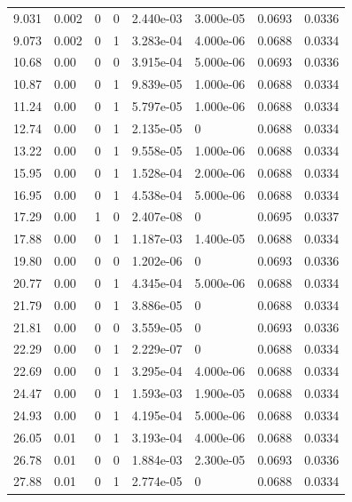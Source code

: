 \documentclass[preview]{standalone}
\begin{document}
{{\begin{tabular}{L{1.2cm}C{1.2cm} C{0.3cm}C{0.5cm} C{1.4cm}C{1.4cm} C{1.4cm}C{1.4cm}}
  9.031  &  0.002  & 0     &  0 &  2.440e-03  & 3.000e-05  & 0.0693 &  0.0336   \\ 
  9.073  &  0.002  & 0     &  1 &  3.283e-04  & 4.000e-06  & 0.0688 &  0.0334   \\ 
  10.68  &  0.00  & 0     &  0 &  3.915e-04  & 5.000e-06  & 0.0693 &  0.0336   \\ 
  10.87  &  0.00  & 0     &  1 &  9.839e-05  & 1.000e-06  & 0.0688 &  0.0334   \\ 
  11.24  &  0.00  & 0     &  1 &  5.797e-05  & 1.000e-06  & 0.0688 &  0.0334   \\ 
  12.74  &  0.00  & 0     &  1 &  2.135e-05  & 0  & 0.0688 &  0.0334   \\ 
  13.22  &  0.00  & 0     &  1 &  9.558e-05  & 1.000e-06  & 0.0688 &  0.0334   \\ 
  15.95  &  0.00  & 0     &  1 &  1.528e-04  & 2.000e-06  & 0.0688 &  0.0334   \\ 
  16.95  &  0.00  & 0     &  1 &  4.538e-04  & 5.000e-06  & 0.0688 &  0.0334   \\ 
  17.29  &  0.00  & 1     &  0 &  2.407e-08  & 0  & 0.0695 &  0.0337   \\ 
  17.88  &  0.00  & 0     &  1 &  1.187e-03  & 1.400e-05  & 0.0688 &  0.0334   \\ 
  19.80  &  0.00  & 0     &  0 &  1.202e-06  & 0  & 0.0693 &  0.0336   \\ 
  20.77  &  0.00  & 0     &  1 &  4.345e-04  & 5.000e-06  & 0.0688 &  0.0334   \\ 
  21.79  &  0.00  & 0     &  1 &  3.886e-05  & 0  & 0.0688 &  0.0334   \\ 
  21.81  &  0.00  & 0     &  0 &  3.559e-05  & 0  & 0.0693 &  0.0336   \\ 
  22.29  &  0.00  & 0     &  1 &  2.229e-07  & 0  & 0.0688 &  0.0334   \\ 
  22.69  &  0.00  & 0     &  1 &  3.295e-04  & 4.000e-06  & 0.0688 &  0.0334   \\ 
  24.47  &  0.00  & 0     &  1 &  1.593e-03  & 1.900e-05  & 0.0688 &  0.0334   \\ 
  24.93  &  0.00  & 0     &  1 &  4.195e-04  & 5.000e-06  & 0.0688 &  0.0334   \\ 
  26.05  &  0.01  & 0     &  1 &  3.193e-04  & 4.000e-06  & 0.0688 &  0.0334   \\ 
  26.78  &  0.01  & 0     &  0 &  1.884e-03  & 2.300e-05  & 0.0693 &  0.0336   \\ 
  27.88  &  0.01  & 0     &  1 &  2.774e-05  & 0  & 0.0688 &  0.0334   \\ 

\end{tabular}}}
\end{document}
